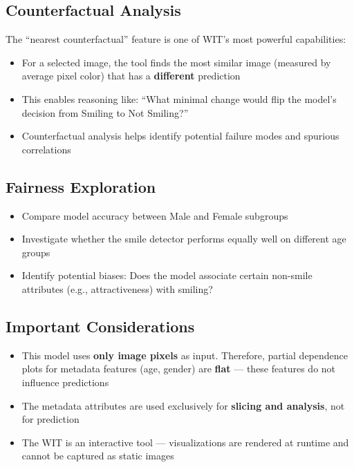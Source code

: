 \documentclass[12pt,a4paper]{article}
\begin{document}
\subsection{Counterfactual Analysis}
The ``nearest counterfactual'' feature is one of WIT's most powerful capabilities:
\begin{itemize}
    \item For a selected image, the tool finds the most similar image (measured by average pixel color) that has a \textbf{different} prediction
    \item This enables reasoning like: ``What minimal change would flip the model's decision from Smiling to Not Smiling?''
    \item Counterfactual analysis helps identify potential failure modes and spurious correlations
\end{itemize}

\subsection{Fairness Exploration}
\begin{itemize}
    \item Compare model accuracy between Male and Female subgroups
    \item Investigate whether the smile detector performs equally well on different age groups
    \item Identify potential biases: Does the model associate certain non-smile attributes (e.g., attractiveness) with smiling?
\end{itemize}

\subsection{Important Considerations}
\begin{itemize}
    \item This model uses \textbf{only image pixels} as input. Therefore, partial dependence plots for metadata features (age, gender) are \textbf{flat} --- these features do not influence predictions
    \item The metadata attributes are used exclusively for \textbf{slicing and analysis}, not for prediction
    \item The WIT is an interactive tool --- visualizations are rendered at runtime and cannot be captured as static images
\end{itemize}

\end{document}
